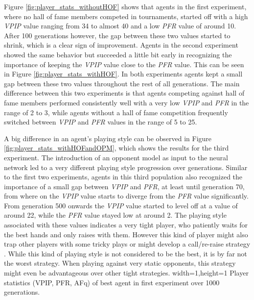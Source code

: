 Figure \ref{fig:player_stats_withoutHOF} shows that agents in the first experiment, where no hall of fame members competed in tournaments, started off with a high \textit{VPIP} value ranging from 34 to almost 40 and a low \textit{PFR} value of around 10. After 100 generations however, the gap between these two values started to shrink, which is a clear sign of improvement. Agents in the second experiment showed the same behavior but succeeded a little bit early in recognizing the importance of keeping the \textit{VPIP} value close to the \textit{PFR} value. This can be seen in Figure \ref{fig:player_stats_withHOF}. In both experiments agents kept a small gap between these two values throughout the rest of all generations. The main difference between this two experiments is that agents competing against hall of fame members performed consistently well with a very low \textit{VPIP} and \textit{PFR} in the range of 2 to 3, while agents without a hall of fame competition frequently switched between \textit{VPIP} and \textit{PFR} values in the range of 5 to 25. \par
A big difference in an agent's playing style can be observed in Figure \ref{fig:player_stats_withHOFandOPM}, which shows the results for the third experiment. The introduction of an opponent model as input to the neural network led to a very different playing style progression over generations. Similar to the first two experiments, agents in this third population also recognized the importance of a small gap between \textit{VPIP} and \textit{PFR}, at least until generation 70, from where on the \textit{VPIP} value starts to diverge from the \textit{PFR} value significantly. From generation 500 onwards the \textit{VPIP} value started to level off at a value of around 22, while the \textit{PFR} value stayed low at around 2. The playing style associated with these values indicates a very tight player, who patiently waits for the best hands and only raises with them. However this kind of player might also trap other players with some tricky plays or might develop a call/re-raise strategy \cite{playing_style}. While this kind of playing style is not considered to be the best, it is by far not the worst strategy. When playing against very static opponents, this strategy might even be advantageous over other tight strategies.
  {width=1\textwidth,height=1\textheight}%
  {Player statistics (VPIP, PFR, AFq) of best agent in first experiment over 1000 generations.}%
